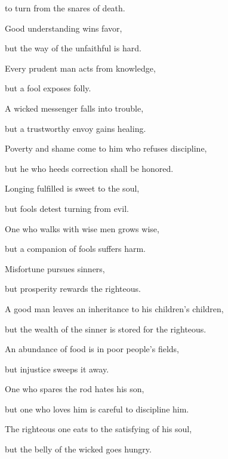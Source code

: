 {\par }{\QB to turn from the snares of death.
\par }{\Q {}Good understanding wins favor,
\par }{\QB but the way of the unfaithful is hard.
\par }{\Q {}Every prudent man acts from knowledge,
\par }{\QB but a fool exposes folly.
\par }{\Q {}A wicked messenger falls into trouble,
\par }{\QB but a trustworthy envoy gains healing.
\par }{\Q {}Poverty and shame come to him who refuses discipline,
\par }{\QB but he who heeds correction shall be honored.
\par }{\Q {}Longing fulfilled is sweet to the soul,
\par }{\QB but fools detest turning from evil.
\par }{\Q {}One who walks with wise men grows wise,
\par }{\QB but a companion of fools suffers harm.
\par }{\Q {}Misfortune pursues sinners,
\par }{\QB but prosperity rewards the righteous.
\par }{\Q {}A good man leaves an inheritance to his children’s children,
\par }{\QB but the wealth of the sinner is stored for the righteous.
\par }{\Q {}An abundance of food is in poor people’s fields,
\par }{\QB but injustice sweeps it away.
\par }{\Q {}One who spares the rod hates his son,
\par }{\QB but one who loves him is careful to discipline him.
\par }{\Q {}The righteous one eats to the satisfying of his soul,
\par }{\QB but the belly of the wicked goes hungry.

}
